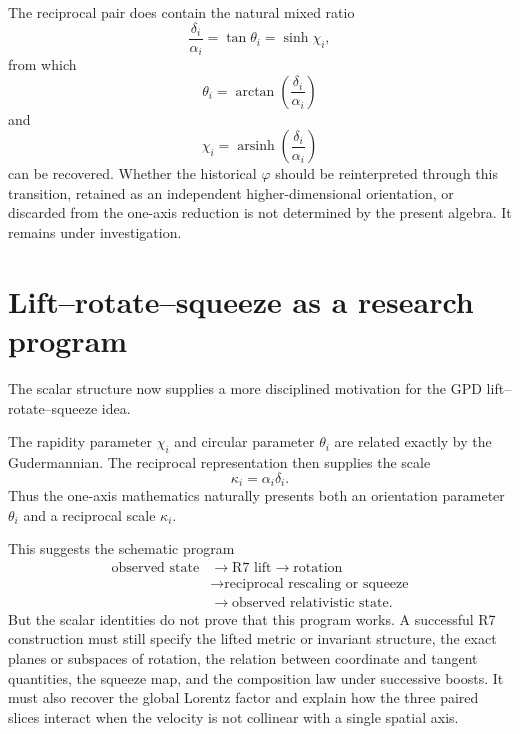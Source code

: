 \documentclass[11pt]{article}
\DeclareMathOperator{\arsinh}{arsinh}
\begin{document}
The reciprocal pair does contain the natural mixed ratio
\begin{equation}
\frac{\delta_i}{\alpha_i}
=
\tan\theta_i
=
\sinh\chi_i,
\label{eq:phi-ratio}
\end{equation}
from which
\begin{equation}
\theta_i
=
\arctan\left(\frac{\delta_i}{\alpha_i}\right)
\end{equation}
and
\begin{equation}
\chi_i
=
\arsinh\left(\frac{\delta_i}{\alpha_i}\right)
\end{equation}
can be recovered. Whether the historical $\varphi$ should be reinterpreted
through this transition, retained as an independent higher-dimensional
orientation, or discarded from the one-axis reduction is not determined by
the present algebra. It remains under investigation.

\section{Lift--rotate--squeeze as a research program}

The scalar structure now supplies a more disciplined motivation for the GPD
lift--rotate--squeeze idea.

The rapidity parameter $\chi_i$ and circular parameter $\theta_i$ are related
exactly by the Gudermannian. The reciprocal representation then supplies the
scale
\begin{equation}
\kappa_i=\alpha_i\delta_i.
\end{equation}
Thus the one-axis mathematics naturally presents both an orientation
parameter $\theta_i$ and a reciprocal scale $\kappa_i$.

This suggests the schematic program
\begin{equation}
\begin{aligned}
\text{observed state}
&\longrightarrow \text{R7 lift}
\longrightarrow \text{rotation}\\
&\longrightarrow \text{reciprocal rescaling or squeeze}\\
&\longrightarrow \text{observed relativistic state}.
\end{aligned}
\label{eq:lrs}
\end{equation}
But the scalar identities do not prove that this program works. A successful
R7 construction must still specify the lifted metric or invariant structure,
the exact planes or subspaces of rotation, the relation between coordinate
and tangent quantities, the squeeze map, and the composition law under
successive boosts. It must also recover the global Lorentz factor and explain
how the three paired slices interact when the velocity is not collinear with
a single spatial axis.
\end{document}
